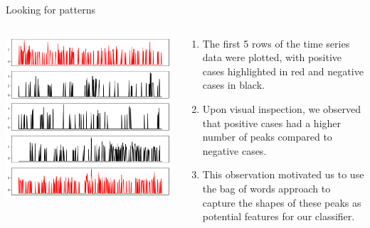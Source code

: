 \begin{frame}{Looking for patterns}
    \begin{columns}[T]
    \begin{column}{0.4\textwidth}
      \includegraphics[width=\textwidth]{images/TSP.png}
    \end{column}
    \begin{column}{0.6\textwidth}
    \begin{enumerate}[$\bullet$]
    \item The first 5 rows of the time series data were plotted, with positive cases highlighted in red and negative cases in black.\pause
    \item Upon visual inspection, we observed that positive cases had a higher number of peaks compared to negative cases.\pause 
    \item This observation motivated us to use the bag of words approach to capture the shapes of these peaks as potential features for our classifier.
    \end{enumerate}
    \end{column}
  \end{columns}
\end{frame}

